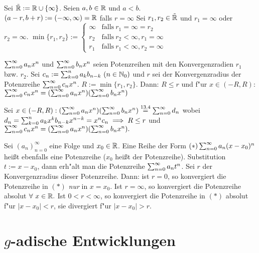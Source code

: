 \documentclass[a4paper,twoside,DIV15,BCOR12mm]{scrbook}
\begin{document}
\begin{vereinbarung}
Sei $\tilde {\mathbb{R}}:=\mathbb{R} \cup \{\infty\}$. Seien $a, b \in\mathbb{R}$ und $a<b$.\\
$(a-r, b+r) := (-\infty, \infty) = \mathbb{R}$ falls $r=\infty$
Sei $r_1, r_2 \in\tilde{\mathbb{R}}$ und $r_1=\infty$ oder $r_2=\infty$.
$\min\{r_1, r_2\} := \begin{cases}
\infty & \text{falls}\ r_1=\infty=r_2\\
r_2 & \text{falls}\ r_2<\infty, r_1=\infty \\
r_1 & \text{falls}\ r_1<\infty, r_2=\infty
\end{cases}$
\end{vereinbarung}

\begin{satz}
$\sum_{n=0}^{\infty}{a_nx^n}$ und $\sum_{n=0}^{\infty}{b_nx^n}$ seien Potenzreihen mit den Konvergenzradien $r_1$ bzw. $r_2$. Sei $c_n:=\sum_{k=0}^{n}{a_kb_{n-k}}\ (n\in\MdN_0)$ und $r$ sei der Konvergenzradius der Potenzreihe $\sum_{n=0}^{\infty}{c_nx^n}$. $R:=\min\{r_1, r_2\}$. Dann: $R\le r$ und f"ur $x \in (-R, R):$ $\sum_{n=0}^{\infty}{c_nx^n}=(\sum_{n=0}^{\infty}{a_nx^n})(\sum_{n=0}^{\infty}{b_nx^n})$
\end{satz}

\begin{beweis}
Sei $x \in (-R, R): (\sum_{n=0}^{\infty}{a_nx^n})(\sum_{n=0}^{\infty}{b_nx^n})\overset{\text{13.4}}{=}\sum_{n=0}^{\infty}{d_n}$ wobei \\$d_n = \sum^{n}_{k=0}{a_kx^kb_{n-k}x^{n-k}} = x^nc_n \implies R\le r$ und \\$\sum_{n=0}^{\infty}{c_nx^n}=(\sum_{n=0}^{\infty}{a_nx^n})(\sum_{n=0}^{\infty}{b_nx^n}).$
\end{beweis}

\begin{bemerkung}
Sei $(a_n)^{\infty}_{n=0}$ eine Folge und $x_0 \in\mathbb{R}$. Eine Reihe der Form $(*) \sum_{n=0}^{\infty}{a_n(x-x_0)^n}$ heißt ebenfalls eine Potenzreihe ($x_0$ heißt  der Potenzreihe). Substitution $t:=x-x_0$, dann erh"alt man die Potenzreihe $\sum_{n=0}^{\infty}{a_nt^n}$. Sei $r$ der Konvergenzradius dieser Potenzreihe. Dann: ist $r=0$, so konvergiert die Potenzreihe in $(*)$ \emph{nur} in $x=x_0$. Ist $r=\infty$, so konvergiert die Potenzreihe absolut $\forall\ x\in\mathbb{R}.$ Ist $0<r<\infty$, so konvergiert die Potenzreihe in $(*)$ absolut f"ur $|x-x_0|<r$, sie divergiert f"ur $|x-x_0|>r.$ 
\end{bemerkung}

\chapter{$g$-adische Entwicklungen}
\end{document}
